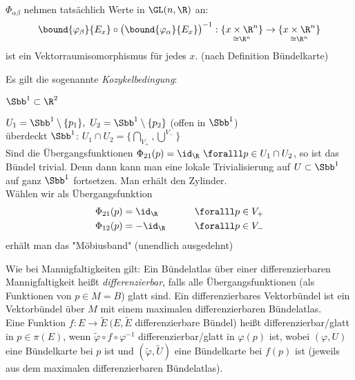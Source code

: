\begin{rem*}
	$\Phi_{\alpha \beta}$ nehmen tatsächlich Werte in $\GL(n,\R)$ an:
	$$ \bound{\varphi_\beta}{E_x} \circ \big( \bound{\varphi_\alpha}{E_x} \big)^{-1}: \underset{\cong \R^n}{\{x \times \R^n\}} \to \underset{\cong \R^n}{\{x \times \R^n\}} $$
	ist ein Vektorraumisomorphismus für jedes $x$. (nach Definition Bündelkarte)
\end{rem*}

\begin{rem*}
	Es gilt die sogenannte \emph{Kozykelbedingung}:
\end{rem*}

\begin{exmp*}
	$ \Sbb^1 \subset \R^2 $\\
	\begin{minipage}{\linewidth}
		\begin{wrapfigure}{R}{4cm}
			\centering
		\end{wrapfigure}
		$ U_1 = \Sbb^1 \setminus \{p_1\},\ U_2 = \Sbb^1 \setminus \{p_2\} $ (offen in $\Sbb^1$)\\
		überdeckt $\Sbb^1$: $ U_1 \cap U_2 = \bigg\{ \underset{V_+}{\bigcap}, \overset{V_-}{\bigcup} \bigg\} $\\
		Sind die Übergangsfunktionen $ \Phi_{21}(p) = \id_\R\ \foralll p \in U_1 \cap U_2 $, so ist das Bündel trivial. Denn dann kann man eine lokale Trivialisierung auf $ U \subset \Sbb^1 $ auf ganz $\Sbb^1$ fortsetzen. Man erhält den Zylinder.\\
		Wählen wir als Übergangsfunktion
		\begin{alignat*}{2}
			\Phi_{21}(p) &= \id_\R \qquad &&\foralll p \in V_+\\
			\Phi_{12}(p) &= -\id_\R \qquad &&\foralll p \in V_-
		\end{alignat*}
		erhält man das "Möbiusband" (unendlich ausgedehnt)
	\end{minipage}
\end{exmp*}

\begin{defn*}
	Wie bei Mannigfaltigkeiten gilt: Ein Bündelatlas über einer differenzierbaren Mannigfaltigkeit heißt \emph{differenzierbar}, falls alle Übergangsfunktionen (als Funktionen von $p \in M = B$) glatt sind. Ein differenzierbares Vektorbündel ist ein Vektorbündel über $M$ mit einem maximalen differenzierbaren Bündelatlas.\\
	Eine Funktion $ f: E \to \tilde{E}\ (E,\tilde{E}$ differenzierbare Bündel) heißt differenzierbar/glatt in $p \in \pi(E)$, wenn $ \tilde{\varphi} \circ f \circ \varphi^{-1} $ differenzierbar/glatt in $\varphi(p)$ ist, wobei $(\varphi,U)$ eine Bündelkarte bei $p$ ist und $(\tilde{\varphi},\tilde{U})$ eine Bündelkarte bei $f(p)$ ist (jeweils aus dem maximalen differenzierbaren Bündelatlas). 
\end{defn*}

